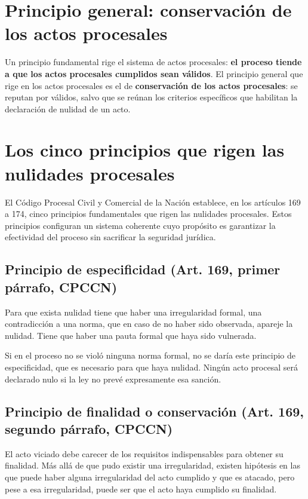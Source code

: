 \documentclass[12pt,oneside]{book}
\begin{document}
\section{Principio general: conservación de los actos procesales}

Un principio fundamental rige el sistema de actos procesales: \textbf{el proceso tiende a que los actos procesales cumplidos sean válidos}. El principio general que rige en los actos procesales es el de \textbf{conservación de los actos procesales}: se reputan por válidos, salvo que se reúnan los criterios específicos que habilitan la declaración de nulidad de un acto.

\section{Los cinco principios que rigen las nulidades procesales}

El Código Procesal Civil y Comercial de la Nación establece, en los artículos 169 a 174, cinco principios fundamentales que rigen las nulidades procesales. Estos principios configuran un sistema coherente cuyo propósito es garantizar la efectividad del proceso sin sacrificar la seguridad jurídica.

\subsection{Principio de especificidad (Art. 169, primer párrafo, CPCCN)}

Para que exista nulidad tiene que haber una irregularidad formal, una contradicción a una norma, que en caso de no haber sido observada, apareje la nulidad. Tiene que haber una pauta formal que haya sido vulnerada.

\begin{important}
Si en el proceso no se violó ninguna norma formal, no se daría este principio de especificidad, que es necesario para que haya nulidad. Ningún acto procesal será declarado nulo si la ley no prevé expresamente esa sanción.
\end{important}

\subsection{Principio de finalidad o conservación (Art. 169, segundo párrafo, CPCCN)}

El acto viciado debe carecer de los requisitos indispensables para obtener su finalidad. Más allá de que pudo existir una irregularidad, existen hipótesis en las que puede haber alguna irregularidad del acto cumplido y que es atacado, pero pese a esa irregularidad, puede ser que el acto haya cumplido su finalidad.
\end{document}
